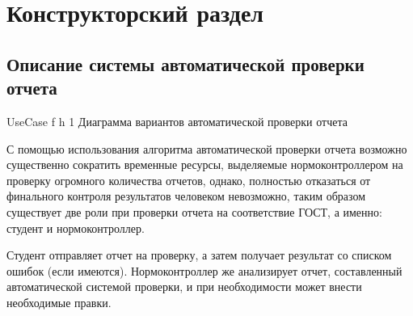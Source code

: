 \chapter{Конструкторский раздел}

\section{Описание системы автоматической проверки отчета}

{UseCase} %
{f} %
{h} %
{1\textwidth} %
{Диаграмма вариантов автоматической проверки отчета} %

С помощью использования алгоритма автоматической проверки отчета возможно существенно сократить временные ресурсы, выделяемые нормоконтроллером на проверку огромного количества отчетов, однако, полностью отказаться от финального контроля результатов человеком невозможно, таким образом существует две роли при проверки отчета на соответствие ГОСТ, а именно: студент и нормоконтроллер.

Студент отправляет отчет на проверку, а затем получает результат со списком ошибок (если имеются). Нормоконтроллер же анализирует отчет, составленный автоматической системой проверки, и при необходимости может внести необходимые правки.
